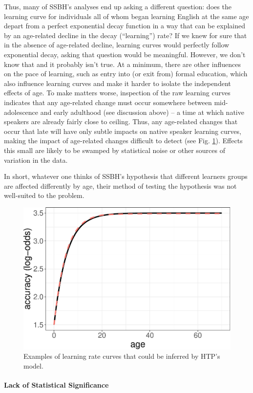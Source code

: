 \documentclass[
  english,
  doc,floatsintext]{apa6}
\let\oldparagraph\paragraph
\renewcommand{\paragraph}[1]{\oldparagraph{#1}\mbox{}}
\begin{document}
Thus, many of SSBH's analyses end up asking a different question: does the learning curve for individuals all of whom began learning English at the same age depart from a perfect exponential decay function in a way that can be explained by an age-related decline in the decay (``learning'') rate? If we knew for sure that in the absence of age-related decline, learning curves would perfectly follow exponential decay, asking that question would be meaningful. However, we don't know that and it probably isn't true. At a minimum, there are other influences on the pace of learning, such as entry into (or exit from) formal education, which also influence learning curves and make it harder to isolate the independent effects of age. To make matters worse, inspection of the raw learning curves indicates that any age-related change must occur somewhere between mid-adolescence and early adulthood (see discussion above) -- a time at which native speakers are already fairly close to ceiling. Thus, any age-related changes that occur that late will have only subtle impacts on native speaker learning curves, making the impact of age-related changes difficult to detect (see Fig. \ref{fig:latechanges}). Effects this small are likely to be swamped by statistical noise or other sources of variation in the data.

In short, whatever one thinks of SSBH's hypothesis that different learners groups are affected differently by age, their method of testing the hypothesis was not well-suited to the problem.



\begin{figure}
\includegraphics[width=0.35\linewidth]{SlikResponse_rmd_files/figure-latex/latechanges-1} \caption{Examples of learning rate curves that could be inferred by HTP's model.}\label{fig:latechanges}
\end{figure}

\hypertarget{lack-of-statistical-significance}{%
\paragraph{Lack of Statistical Significance}\label{lack-of-statistical-significance}}
\end{document}
